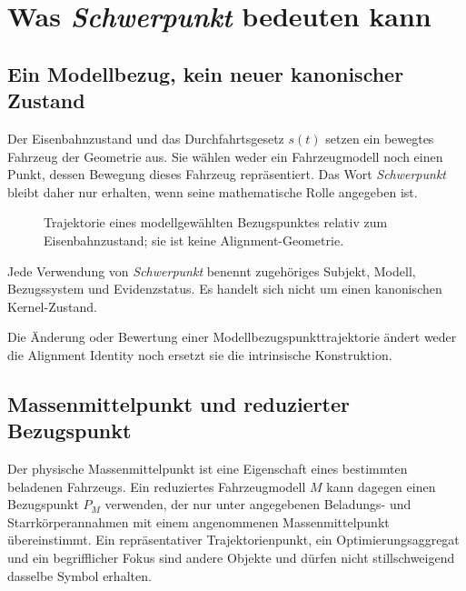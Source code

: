 \chapter{Was \emph{Schwerpunkt} bedeuten kann}
\label{chap:schwerpunkt-state}

\section*{Ein Modellbezug, kein neuer kanonischer Zustand}

Der Eisenbahnzustand und das Durchfahrtsgesetz \(s(t)\) setzen ein bewegtes
Fahrzeug der Geometrie aus. Sie wählen weder ein Fahrzeugmodell noch einen
Punkt, dessen Bewegung dieses Fahrzeug repräsentiert. Das Wort
\emph{Schwerpunkt} bleibt daher nur erhalten, wenn seine mathematische Rolle
angegeben ist.

\begin{figure}[htbp]
\centering

\caption{Trajektorie eines modellgewählten Bezugspunktes relativ zum Eisenbahnzustand; sie ist keine Alignment-Geometrie.}
\label{fig:schwerpunkt-trajectory}
\end{figure}

\begin{principle}
\label{princ:schwerpunkt-principle}
Jede Verwendung von \emph{Schwerpunkt} benennt zugehöriges Subjekt, Modell,
Bezugssystem und Evidenzstatus. Es handelt sich nicht um einen kanonischen
Kernel-Zustand.
\end{principle}

\begin{principle}
\label{princ:schwerpunkt-not-geometry}
Die Änderung oder Bewertung einer Modellbezugspunkttrajektorie ändert weder
die Alignment Identity noch ersetzt sie die intrinsische Konstruktion.
\end{principle}

\section{Massenmittelpunkt und reduzierter Bezugspunkt}

Der physische Massenmittelpunkt ist eine Eigenschaft eines bestimmten
beladenen Fahrzeugs. Ein reduziertes Fahrzeugmodell \(M\) kann dagegen einen
Bezugspunkt \(P_M\) verwenden, der nur unter angegebenen Beladungs- und
Starrkörperannahmen mit einem angenommenen Massenmittelpunkt übereinstimmt.
Ein repräsentativer Trajektorienpunkt, ein Optimierungsaggregat und ein
begrifflicher Fokus sind andere Objekte und dürfen nicht stillschweigend
dasselbe Symbol erhalten.

